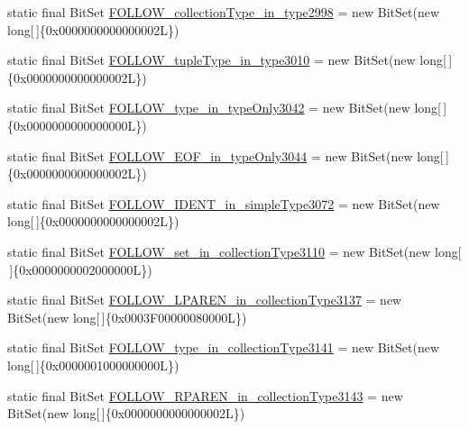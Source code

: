 \begin{DoxyCompactItemize}
\item 
static final Bit\-Set \hyperlink{classorg_1_1tzi_1_1use_1_1parser_1_1ocl_1_1_o_c_l_parser_a198cd0db094797a16be655a62126760d}{F\-O\-L\-L\-O\-W\-\_\-collection\-Type\-\_\-in\-\_\-type2998} = new Bit\-Set(new long\mbox{[}$\,$\mbox{]}\{0x0000000000000002\-L\})
\item 
static final Bit\-Set \hyperlink{classorg_1_1tzi_1_1use_1_1parser_1_1ocl_1_1_o_c_l_parser_a3ba8e19448768f8b9e721a219fb0692d}{F\-O\-L\-L\-O\-W\-\_\-tuple\-Type\-\_\-in\-\_\-type3010} = new Bit\-Set(new long\mbox{[}$\,$\mbox{]}\{0x0000000000000002\-L\})
\item 
static final Bit\-Set \hyperlink{classorg_1_1tzi_1_1use_1_1parser_1_1ocl_1_1_o_c_l_parser_a52e5dfdc891d9abc71aa61a54bcf5364}{F\-O\-L\-L\-O\-W\-\_\-type\-\_\-in\-\_\-type\-Only3042} = new Bit\-Set(new long\mbox{[}$\,$\mbox{]}\{0x0000000000000000\-L\})
\item 
static final Bit\-Set \hyperlink{classorg_1_1tzi_1_1use_1_1parser_1_1ocl_1_1_o_c_l_parser_a1c40a45530ea45ed537f7c5a5137a9ff}{F\-O\-L\-L\-O\-W\-\_\-\-E\-O\-F\-\_\-in\-\_\-type\-Only3044} = new Bit\-Set(new long\mbox{[}$\,$\mbox{]}\{0x0000000000000002\-L\})
\item 
static final Bit\-Set \hyperlink{classorg_1_1tzi_1_1use_1_1parser_1_1ocl_1_1_o_c_l_parser_a8f6a8523a8e8610863e0eeb8e4d6e2ad}{F\-O\-L\-L\-O\-W\-\_\-\-I\-D\-E\-N\-T\-\_\-in\-\_\-simple\-Type3072} = new Bit\-Set(new long\mbox{[}$\,$\mbox{]}\{0x0000000000000002\-L\})
\item 
static final Bit\-Set \hyperlink{classorg_1_1tzi_1_1use_1_1parser_1_1ocl_1_1_o_c_l_parser_a8ea7b02355ca3f1ded412800eb776fff}{F\-O\-L\-L\-O\-W\-\_\-set\-\_\-in\-\_\-collection\-Type3110} = new Bit\-Set(new long\mbox{[}$\,$\mbox{]}\{0x0000000002000000\-L\})
\item 
static final Bit\-Set \hyperlink{classorg_1_1tzi_1_1use_1_1parser_1_1ocl_1_1_o_c_l_parser_a68444bce9d08e98b5c0b099c03c767f4}{F\-O\-L\-L\-O\-W\-\_\-\-L\-P\-A\-R\-E\-N\-\_\-in\-\_\-collection\-Type3137} = new Bit\-Set(new long\mbox{[}$\,$\mbox{]}\{0x0003\-F00000080000\-L\})
\item 
static final Bit\-Set \hyperlink{classorg_1_1tzi_1_1use_1_1parser_1_1ocl_1_1_o_c_l_parser_a4240b8901a4c237072a1909a84f41014}{F\-O\-L\-L\-O\-W\-\_\-type\-\_\-in\-\_\-collection\-Type3141} = new Bit\-Set(new long\mbox{[}$\,$\mbox{]}\{0x0000001000000000\-L\})
\item 
static final Bit\-Set \hyperlink{classorg_1_1tzi_1_1use_1_1parser_1_1ocl_1_1_o_c_l_parser_a9bbb44a33cd68dac6f4c4b3cd5f05e4f}{F\-O\-L\-L\-O\-W\-\_\-\-R\-P\-A\-R\-E\-N\-\_\-in\-\_\-collection\-Type3143} = new Bit\-Set(new long\mbox{[}$\,$\mbox{]}\{0x0000000000000002\-L\})

\end{DoxyCompactItemize}
